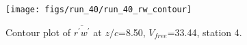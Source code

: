 \begin{figure}[H]
\centering
\texttt{[image: figs/run\_40/run\_40\_rw\_contour]}
\caption{Contour plot of $\overline{r^\prime w^\prime}$ at $z/c$=8.50, $V_{free}$=33.44, station 4.}
\label{fig:run_40_rw_contour}
\end{figure}


